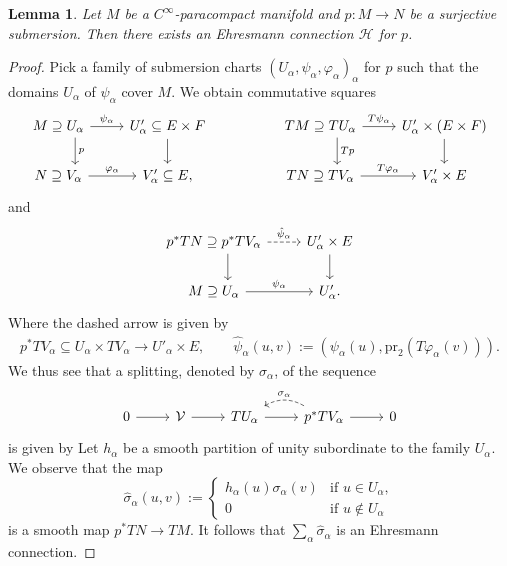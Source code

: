 \documentclass[11pt]{article}
\numberwithin{equation}{section}
\numberwithin{equation}{section}
\newtheorem{Lemma}[Theorem]{Lemma}
\newcommand{\cH}{\ensuremath{\mathcal{H}}}
\begin{document}
\begin{Lemma}\label{lem:ex_Ehresmann}
Let $M$ be a $C^\infty$-paracompact manifold and $p\colon M \rightarrow N$ be a surjective submersion. Then there exists an Ehresmann connection $\cH$ for $p$.
\end{Lemma}

\begin{proof}
 Pick a family of submersion charts $(U_\alpha, \psi_\alpha,\varphi_\alpha)_{\alpha}$ for $p$ such that the domains $U_\alpha$ of $\psi_\alpha$ cover $M$.
 We obtain commutative squares
 \begin{equation*}
 \begin{tikzcd}
 M \supseteq U_{\alpha} \ar[r,"\psi_{\alpha}"] \ar[d,"p", shift left=12pt] & U'_{\alpha}\subseteq E \times F \ar[d] & & TM \supseteq TU_{\alpha} \ar[r,"T\psi_{\alpha}"] \ar[d,"Tp", shift left=12pt] & U_{\alpha}' \times (E \times F) \ar[d] \\
 N \supseteq V_{\alpha} \ar[r,"\varphi_{\alpha}"] & V'_{\alpha} \subseteq E, & & TN \supseteq TV_{\alpha} \ar[r,"T\varphi_{\alpha}"] & V'_{\alpha} \times E
 \end{tikzcd}
 \end{equation*}
 and
 \begin{equation*}
 \begin{tikzcd}
 p^{*}TN\supseteq p^{*}TV_{\alpha} \ar[d, shift left=10pt] \ar[r, dashed,"\hat{\psi}_{\alpha}"] & U'_{\alpha} \times E \ar[d] \\
 M \supseteq U_{\alpha} \ar[r,"\psi_{\alpha}"] & U'_{\alpha}.
 \end{tikzcd}
 \end{equation*}
 Where the dashed arrow is given by
 \begin{align*}
 p^{*}TV_{\alpha} \subseteq U_{\alpha} \times TV_{\alpha} \rightarrow U'_{\alpha} \times E,\qquad \hat{\psi}_{\alpha}(u,v) := (\psi_{\alpha}(u), \mathrm{pr}_{2}(T\varphi_{\alpha}(v))).
 \end{align*}
 We thus see that a splitting, denoted by $\sigma_{\alpha}$, of the sequence
 \begin{equation*}
 \begin{tikzcd}
 0 \ar[r] & \mathcal{V} \ar[r] & TU_{\alpha} \ar[r] & p^{*}TV_{\alpha} \ar[r] \ar[l,bend right, dashed, "\sigma_{\alpha}"'] & 0
 \end{tikzcd}
 \end{equation*}
 is given by
 Let $h_{\alpha}$ be a smooth partition of unity subordinate to the family $U_{\alpha}$.
 We observe that the map
 \begin{equation*}
 \hat{\sigma}_{\alpha}(u,v) := \begin{cases}
 h_{\alpha}(u) \sigma_{\alpha}(v) & \text{if } u \in U_{\alpha}, \\
 0 & \text{if } u \notin U_{\alpha}
 \end{cases}
 \end{equation*}
 is a smooth map $p^{*}TN \rightarrow TM$.
 It follows that $\sum_{\alpha} \hat{\sigma}_{\alpha}$ is an Ehresmann connection.
\end{proof}
\end{document}
